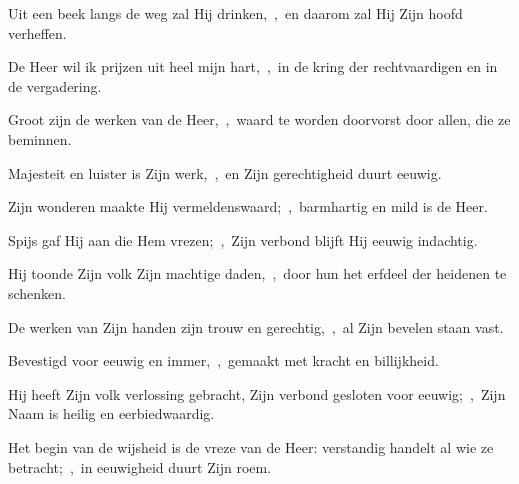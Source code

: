 \documentclass[12pt,twoside,a5paper]{article}
\begin{document}
\begin{halfparskip}
  Uit een beek langs de weg zal Hij drinken,~\sep\ en daarom zal Hij Zijn hoofd verheffen.

   De Heer wil ik prijzen uit heel mijn hart,~\sep\ in de kring der rechtvaardigen en in de vergadering.

  Groot zijn de werken van de Heer,~\sep\ waard te worden doorvorst door allen, die ze beminnen.

  Majesteit en luister is Zijn werk,~\sep\ en Zijn gerechtigheid duurt eeuwig.

  Zijn wonderen maakte Hij vermeldenswaard;~\sep\ barmhartig en mild is de Heer.

  Spijs gaf Hij aan die Hem vrezen;~\sep\ Zijn verbond blijft Hij eeuwig indachtig.

  Hij toonde Zijn volk Zijn machtige daden,~\sep\ door hun het erfdeel der heidenen te schenken.

  De werken van Zijn handen zijn trouw en gerechtig,~\sep\ al Zijn bevelen staan vast.

  Bevestigd voor eeuwig en immer,~\sep\ gemaakt met kracht en billijkheid.

  Hij heeft Zijn volk verlossing gebracht, Zijn verbond gesloten voor eeuwig;~\sep\ Zijn Naam is heilig en eerbiedwaardig.

  Het begin van de wijsheid is de vreze van de Heer: verstandig handelt al wie ze betracht;~\sep\ in eeuwigheid duurt Zijn roem.
\end{halfparskip}

\end{document}
